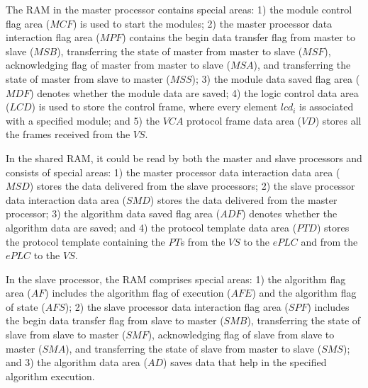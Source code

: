 \documentclass[journal,UTF8]{IEEEtran}
\begin{document}
	The RAM in the master processor contains special areas: 1) the module control flag area ($MCF$) is used to start the modules; 2) the master processor data interaction flag area ($MPF$) contains the begin data transfer flag from master to slave ($MSB$), transferring the state of master from master to slave ($MSF$), acknowledging flag of master from master to slave ($MSA$), and transferring the state of master from slave to master ($MSS$); 3) the module data saved flag area ($MDF$) denotes whether the module data are saved; 4) the logic control data area ($LCD$) is used to store the control frame, where every element $lcd_i$ is associated with a specified module; and 5) the $VCA$ protocol frame data area ($VD$) stores all the frames received from the $VS$.  
	
	In the shared RAM, it could be read by both the master and slave processors and consists of special areas: 1) the master processor data interaction data area ($MSD$) stores the data delivered from the slave processors; 2) the slave processor data interaction data area ($SMD$) stores the data delivered from the master processor; 3) the algorithm data saved flag area ($ADF$) denotes whether the algorithm data are saved; and 4) the protocol template data area ($PTD$) stores the protocol template containing the $PT$s from the $VS$ to the $ePLC$ and from the $ePLC$ to the $VS$.
	
	
	In the slave processor, the RAM comprises special areas: 1) the algorithm flag area ($AF$) includes the algorithm flag of execution ($AFE$) and the algorithm flag of state ($AFS$); 2) the slave processor data interaction flag area ($SPF$) includes the begin data transfer flag from slave to master ($SMB$), transferring the state of slave from slave to master ($SMF$), acknowledging flag of slave from slave to master ($SMA$), and transferring the state of slave from master to slave ($SMS$); and 3) the algorithm data area ($AD$) saves data that help in the specified algorithm execution.
	
\end{document}
